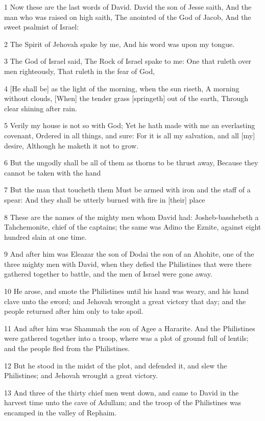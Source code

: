\par 1 Now these are the last words of David. David the son of Jesse saith, And the man who was raised on high saith, The anointed of the God of Jacob, And the sweet psalmist of Israel:
\par 2 The Spirit of Jehovah spake by me, And his word was upon my tongue.
\par 3 The God of Israel said, The Rock of Israel spake to me: One that ruleth over men righteously, That ruleth in the fear of God,
\par 4 [He shall be] as the light of the morning, when the sun riseth, A morning without clouds, [When] the tender grass [springeth] out of the earth, Through clear shining after rain.
\par 5 Verily my house is not so with God; Yet he hath made with me an everlasting covenant, Ordered in all things, and sure: For it is all my salvation, and all [my] desire, Although he maketh it not to grow.
\par 6 But the ungodly shall be all of them as thorns to be thrust away, Because they cannot be taken with the hand
\par 7 But the man that toucheth them Must be armed with iron and the staff of a spear: And they shall be utterly burned with fire in [their] place
\par 8 These are the names of the mighty men whom David had: Josheb-basshebeth a Tahchemonite, chief of the captains; the same was Adino the Eznite, against eight hundred slain at one time.
\par 9 And after him was Eleazar the son of Dodai the son of an Ahohite, one of the three mighty men with David, when they defied the Philistines that were there gathered together to battle, and the men of Israel were gone away.
\par 10 He arose, and smote the Philistines until his hand was weary, and his hand clave unto the sword; and Jehovah wrought a great victory that day; and the people returned after him only to take spoil.
\par 11 And after him was Shammah the son of Agee a Hararite. And the Philistines were gathered together into a troop, where was a plot of ground full of lentils; and the people fled from the Philistines.
\par 12 But he stood in the midst of the plot, and defended it, and slew the Philistines; and Jehovah wrought a great victory.
\par 13 And three of the thirty chief men went down, and came to David in the harvest time unto the cave of Adullam; and the troop of the Philistines was encamped in the valley of Rephaim.
